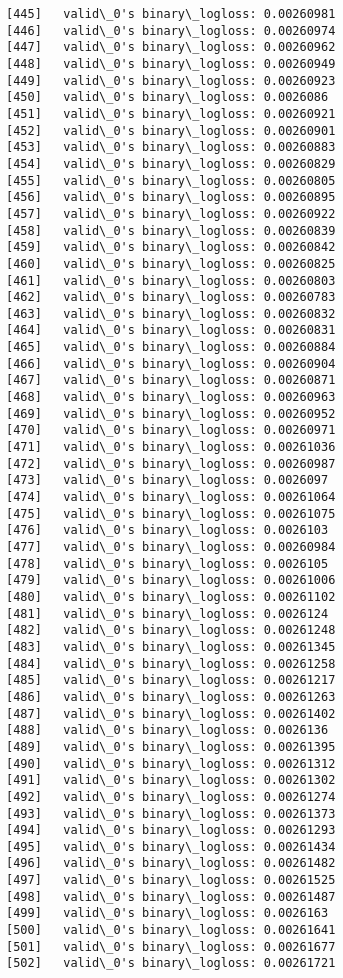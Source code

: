 \documentclass[11pt]{article}
\begin{document}
\begin{Verbatim}[commandchars=\\\{\}]
[445]	valid\_0's binary\_logloss: 0.00260981
[446]	valid\_0's binary\_logloss: 0.00260974
[447]	valid\_0's binary\_logloss: 0.00260962
[448]	valid\_0's binary\_logloss: 0.00260949
[449]	valid\_0's binary\_logloss: 0.00260923
[450]	valid\_0's binary\_logloss: 0.0026086
[451]	valid\_0's binary\_logloss: 0.00260921
[452]	valid\_0's binary\_logloss: 0.00260901
[453]	valid\_0's binary\_logloss: 0.00260883
[454]	valid\_0's binary\_logloss: 0.00260829
[455]	valid\_0's binary\_logloss: 0.00260805
[456]	valid\_0's binary\_logloss: 0.00260895
[457]	valid\_0's binary\_logloss: 0.00260922
[458]	valid\_0's binary\_logloss: 0.00260839
[459]	valid\_0's binary\_logloss: 0.00260842
[460]	valid\_0's binary\_logloss: 0.00260825
[461]	valid\_0's binary\_logloss: 0.00260803
[462]	valid\_0's binary\_logloss: 0.00260783
[463]	valid\_0's binary\_logloss: 0.00260832
[464]	valid\_0's binary\_logloss: 0.00260831
[465]	valid\_0's binary\_logloss: 0.00260884
[466]	valid\_0's binary\_logloss: 0.00260904
[467]	valid\_0's binary\_logloss: 0.00260871
[468]	valid\_0's binary\_logloss: 0.00260963
[469]	valid\_0's binary\_logloss: 0.00260952
[470]	valid\_0's binary\_logloss: 0.00260971
[471]	valid\_0's binary\_logloss: 0.00261036
[472]	valid\_0's binary\_logloss: 0.00260987
[473]	valid\_0's binary\_logloss: 0.0026097
[474]	valid\_0's binary\_logloss: 0.00261064
[475]	valid\_0's binary\_logloss: 0.00261075
[476]	valid\_0's binary\_logloss: 0.0026103
[477]	valid\_0's binary\_logloss: 0.00260984
[478]	valid\_0's binary\_logloss: 0.0026105
[479]	valid\_0's binary\_logloss: 0.00261006
[480]	valid\_0's binary\_logloss: 0.00261102
[481]	valid\_0's binary\_logloss: 0.0026124
[482]	valid\_0's binary\_logloss: 0.00261248
[483]	valid\_0's binary\_logloss: 0.00261345
[484]	valid\_0's binary\_logloss: 0.00261258
[485]	valid\_0's binary\_logloss: 0.00261217
[486]	valid\_0's binary\_logloss: 0.00261263
[487]	valid\_0's binary\_logloss: 0.00261402
[488]	valid\_0's binary\_logloss: 0.0026136
[489]	valid\_0's binary\_logloss: 0.00261395
[490]	valid\_0's binary\_logloss: 0.00261312
[491]	valid\_0's binary\_logloss: 0.00261302
[492]	valid\_0's binary\_logloss: 0.00261274
[493]	valid\_0's binary\_logloss: 0.00261373
[494]	valid\_0's binary\_logloss: 0.00261293
[495]	valid\_0's binary\_logloss: 0.00261434
[496]	valid\_0's binary\_logloss: 0.00261482
[497]	valid\_0's binary\_logloss: 0.00261525
[498]	valid\_0's binary\_logloss: 0.00261487
[499]	valid\_0's binary\_logloss: 0.0026163
[500]	valid\_0's binary\_logloss: 0.00261641
[501]	valid\_0's binary\_logloss: 0.00261677
[502]	valid\_0's binary\_logloss: 0.00261721

\end{Verbatim}
\end{document}
